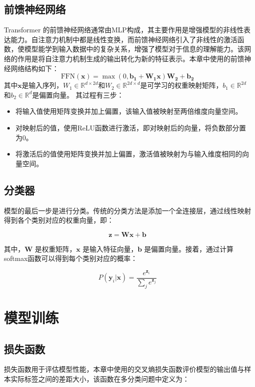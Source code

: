 \subsection{前馈神经网络}
Transformer 的前馈神经网络通常由MLP构成，其主要作用是增强模型的非线性表达能力。自注意力机制中都是线性变换，而前馈神经网络引入了非线性的激活函数，使模型能学到输入数据中的复杂关系，增强了模型对于信息的理解能力。该网络的作用是将自注意力机制生成的输出转化为新的特征表示。本章中使用的前馈神经网络结构如下：
\begin{equation}
\mathrm{FFN}(\mathbf{x})=\max(0, \mathbf{b_1} + \mathbf{W_1}\mathbf{x}) \mathbf{W_2} + \mathbf{b_2}
\end{equation}
其中$\mathbf{x}$是输入序列，$W_1\in \mathbb{R}^{d \times 2d}$和$W_2\in \mathbb{R}^{2d \times d}$是可学习的权重映射矩阵，$b_1 \in \mathbb{R}^{2d}$和$b_2\in \mathbb{R}^{d}$是偏置向量。
其过程有三步：
\begin{itemize}
\item 将输入值使用矩阵变换并加上偏置，该输入值被映射至两倍维度向量空间。
\item 对映射后的值，使用ReLU函数进行激活，即对映射后的向量，将负数部分置为0。
\item 将激活后的值使用矩阵变换并加上偏置，激活值被映射为与输入维度相同的向量空间。
\end{itemize}

\subsection{分类器}
模型的最后一步是进行分类。传统的分类方法是添加一个全连接层，通过线性映射得到各个类别对应的权重向量，即：

\begin{equation}
\mathbf{z} = \mathbf{W}\mathbf{x} + \mathbf{b}
\end{equation}

其中，$\mathbf{W}$ 是权重矩阵，$\mathbf{x}$ 是输入特征向量，$\mathbf{b}$ 是偏置向量。接着，通过计算softmax函数可以得到每个类别对应的概率：

\begin{equation}
P(\mathbf{y}_i|\mathbf{x}) = \frac{e^{\mathbf{z}_i}}{\sum_j e^{\mathbf{z}_j}} 
\end{equation}

\section{模型训练}

\subsection{损失函数}
损失函数用于评估模型性能，本章中使用的交叉熵损失函数评价模型的输出值与样本实际标签之间的差距大小，该函数在多分类问题中定义为：

